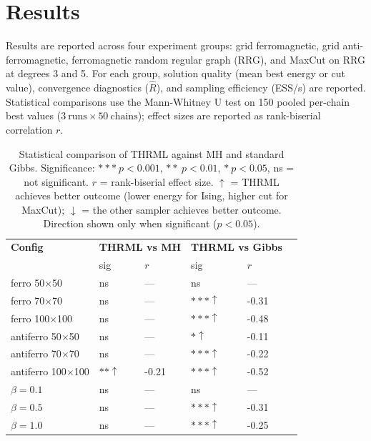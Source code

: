 \documentclass[conference]{IEEEtran}
\begin{document}
\section{Results}\label{sec:results}

Results are reported across four experiment groups: grid ferromagnetic, grid anti-ferromagnetic, ferromagnetic random regular graph (RRG), and MaxCut on RRG at degrees 3 and 5. For each group, solution quality (mean best energy or cut value), convergence diagnostics ($\hat{R}$), and sampling efficiency (ESS/s) are reported. Statistical comparisons use the Mann-Whitney U test on 150 pooled per-chain best values ($3\ \text{runs} \times 50\ \text{chains}$); effect sizes are reported as rank-biserial correlation $r$.

\begin{table}[h]
  \caption{Statistical comparison of THRML against MH and standard Gibbs. Significance: $***\ p{<}0.001$, $**\ p{<}0.01$, $*\ p{<}0.05$, ns = not significant. $r$ = rank-biserial effect size. $\uparrow$ = THRML achieves better outcome (lower energy for Ising, higher cut for MaxCut); $\downarrow$ = the other sampler achieves better outcome. Direction shown only when significant ($p < 0.05$).}
  \label{tab:significance}
  \centering
  \small
  \begin{tabular}{llllll}
    \hline
    \textbf{Config} & \multicolumn{2}{c}{\textbf{THRML vs MH}} & \multicolumn{2}{c}{\textbf{THRML vs Gibbs}} \\
    & sig & $r$ & sig & $r$ \\
    \hline
    ferro 50$\times$50       & ns     &  ---   & ns      &  ---  \\
    ferro 70$\times$70       & ns     &  ---   & $***\uparrow$ & -0.31 \\
    ferro 100$\times$100     & ns     &  ---   & $***\uparrow$ & -0.48 \\
    antiferro 50$\times$50   & ns     &  ---   & $*\uparrow$   & -0.11 \\
    antiferro 70$\times$70   & ns     &  ---   & $***\uparrow$ & -0.22 \\
    antiferro 100$\times$100 & $**\uparrow$ & -0.21 & $***\uparrow$ & -0.52 \\
    $\beta=0.1$              & ns     &  ---   & ns      &  ---  \\
    $\beta=0.5$              & ns     &  ---   & $***\uparrow$ & -0.31 \\
    $\beta=1.0$              & ns     &  ---   & $***\uparrow$ & -0.25 \\

\end{tabular}
\end{table}
\end{document}
